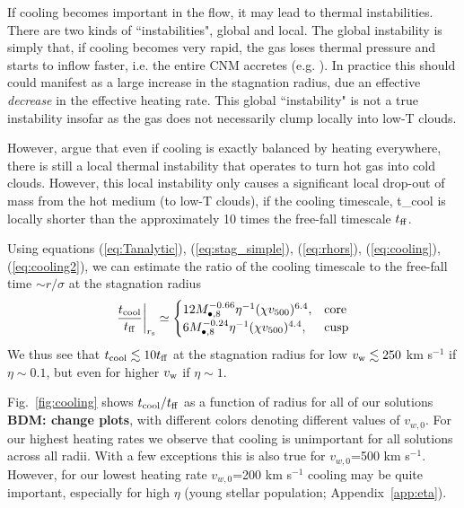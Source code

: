 \documentclass[usenatbib,fleqn]{mn2e}
\newcommand{\Mbheight}{M_{\bullet,8}}
\newcommand{\vwO}{v_{w,0}}
\begin{document}
If cooling becomes important in the flow, it may lead to thermal
instabilities.  There are two kinds of ``instabilities", global and
local.  The global instability is simply that, if cooling becomes very
rapid, the gas loses thermal pressure and starts to inflow faster,
i.e. the entire CNM accretes (e.g. ).  In
practice this should could manifest as a large increase in the
stagnation radius, due an effective {\it decrease} in the effective
heating rate.  This global ``instability" is not a true instability
insofar as the gas does not necessarily clump locally into low-T
clouds.

However, \citealt{McCourt+12} argue that even if cooling is exactly balanced by heating everywhere, there is still a local thermal instability that operates to turn hot gas into cold clouds.  However, this local instability only causes a significant local drop-out of mass from the hot medium (to low-T clouds), if the cooling timescale,
\be
t_{\rm cool} \equiv {}
\ee 
is locally shorter than the approximately 10 times the free-fall timescale $t_{\rm ff}$. 

Using equations (\ref{eq:Tanalytic}), (\ref{eq:stag_simple}), (\ref{eq:rhors}), (\ref{eq:cooling}), (\ref{eq:cooling2}), we can estimate the ratio of the cooling timescale to the free-fall time $\sim r/\sigma$ at the stagnation radius
\begin{align}
  \left.\frac{t_{\rm cool}}{t_{\rm ff}}\right|_{r_{\rm s}}\simeq
  \begin{cases}
    12 \Mbheight^{-0.66} \eta^{-1}(\chi v_{500})^{6.4}, & \text{core}\\
    6  \Mbheight^{-0.24} \eta^{-1}(\chi v_{500})^{4.4} ,   & \text{cusp}
  \end{cases}
  \label{eq:coolingratio}
\end{align}
We thus see that $t_{\rm cool} \lesssim 10 t_{\rm ff}$ at the stagnation radius for low $v_{\rm w} \lesssim 250$ km s$^{-1}$ if $\eta \sim 0.1$, but even for higher $v_{\rm w}$ if $\eta \sim 1$.    

Fig.~\ref{fig:cooling} shows $t_{\rm cool}/t_{\rm ff}$ as a function of radius for all of our solutions {\bf BDM: change plots}, with different colors denoting different values of $v_{w,0}$.  For our highest heating rates we observe that cooling is unimportant for all solutions across all radii.  With a few exceptions this is also true for $\vwO$=500 km s$^{-1}$.  However, for our lowest heating rate $\vwO$=200 km s$^{-1}$ cooling may be quite important, especially for high $\eta$ (young stellar population;  Appendix~\ref{app:eta}).  
\end{document}
